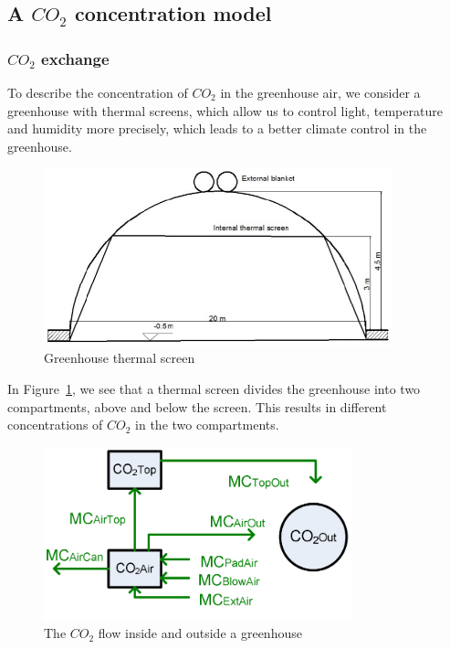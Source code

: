 \documentclass[a4paper]{article}
\numberwithin{equation}{section}
\begin{document}
\subsection{A \texorpdfstring{\( CO_2 \)}{} concentration model}
\subsubsection{\texorpdfstring{\( CO_2 \)}{} exchange}
To describe the concentration of \( CO_2 \) in the greenhouse air, we consider a greenhouse with thermal screens, which allow us to control light, temperature and humidity more precisely, which leads to a better climate control in the greenhouse.
\begin{figure}[H]
  \centering
  \includegraphics[width=0.9\textwidth]{thrscr.png}
  \caption{Greenhouse thermal screen}\label{fig:thrscr}
\end{figure}

In Figure~\ref{fig:thrscr}, we see that a thermal screen divides the greenhouse into two compartments, above and below the screen.
This results in different concentrations of \( CO_2 \) in the two compartments.
\begin{figure}[H]
  \centering
  \includegraphics[width=0.8\textwidth]{CO2}
  \caption{The \( CO_2 \) flow inside and outside a greenhouse}\label{fig:CO2}
\end{figure}
\end{document}
